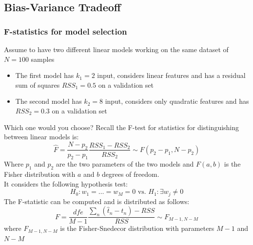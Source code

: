 \subsection{Bias-Variance Tradeoff}
\subsubsection{F-statistics for model selection}
    Assume to have two different linear models working on the same dataset of $N=100$ samples
    \begin{itemize}
        \item The first model has $k_1=2$ input, considers linear features and has a residual sum of squares $RSS_1=0.5$ on a validation set
        \item The second model has $k_2=8$ input, considers only quadratic features and has $RSS_2=0.3$ on a validation set
    \end{itemize}
    Which one would you choose? Recall the F-test for statistics for distinguishing between linear models is:
    $$\hat{F}=\frac{N-p_2}{p_2-p_1}\frac{RSS_1-RSS_2}{RSS_2}\sim F(p_2-p_1,N-p_2)$$
    Where $p_1$ and $p_2$ are the two parameters of the two models and $F(a,b)$ is the Fisher distribution with $a$ and $b$ degrees of freedom.\\
    It considers the following hypothesis test:
    $$H_0: w_1 = \dots = w_M = 0 \text{ vs. }  H_1: \exists w_j \neq 0$$
    The F-statistic can be computed and is distributed as follows:
    $$F = \frac{dfe}{M - 1}\frac{\sum_n (\hat{t}_n-t_n)- RSS}{RSS} \sim F_{M-1, N-M} $$
    where $F_{M-1, N-M}$ is the Fisher-Snedecor distribution with parameters $M-1$ and $N-M$


